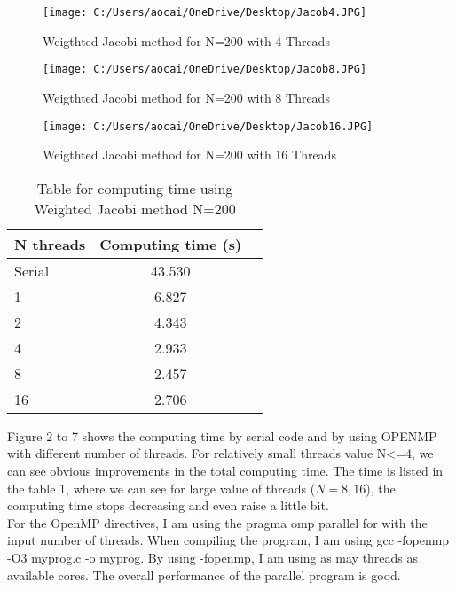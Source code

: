 \documentclass[12pt]{article}
\begin{document}
\begin{figure}[H]
	\centering
	\texttt{[image: C:/Users/aocai/OneDrive/Desktop/Jacob4.JPG]}
	\caption[Optional caption]{Weigthted Jacobi method for N=200 with 4 Threads}
	\label{Jacob3}
\end{figure}

\begin{figure}[H]
	\centering
	\texttt{[image: C:/Users/aocai/OneDrive/Desktop/Jacob8.JPG]}
	\caption[Optional caption]{Weigthted Jacobi method for N=200 with 8 Threads}
	\label{Jacob4}
\end{figure}

\begin{figure}[H]
	\centering
	\texttt{[image: C:/Users/aocai/OneDrive/Desktop/Jacob16.JPG]}
	\caption[Optional caption]{Weigthted Jacobi method for N=200 with 16 Threads}
	\label{Jacob4}
\end{figure}

\begin{table}[H]
	\centering
	\label{tab:cg}
	\begin{tabular}{lcr}
	\bfseries N {threads} & Computing time (s)\\ \hline
	Serial & 43.530\\
	1 & 6.827\\
	2 & 4.343\\
	4 & 2.933\\
	8 & 2.457\\
	16 & 2.706\\
	\end{tabular}
	\caption[This is optional caption, without reference]{Table for computing time using Weighted Jacobi method N=200}
\end{table}

Figure 2 to 7 shows the computing time by serial code and by using OPENMP with different number of threads. For relatively small threads value N<=4, we can see obvious improvements in the total computing time. The time is listed in the table 1, where we can see for large value of threads ($N = 8, 16$), the computing time stops decreasing and even raise a little bit.\\

For the OpenMP directives, I am using the pragma omp parallel for with the input number of threads. When compiling the program, I am using gcc -fopenmp -O3 myprog.c -o myprog. By using -fopenmp, I am using as may threads as available cores. The overall performance of the parallel program is good.
 
\end{document}
